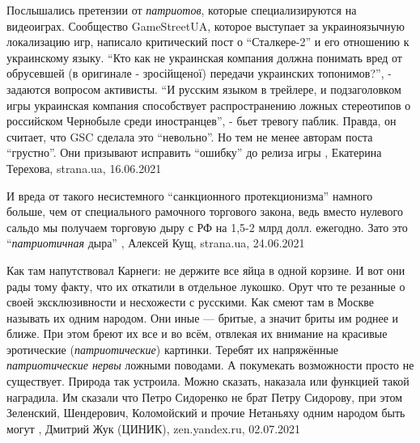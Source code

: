 Послышались претензии от \emph{патриотов}, которые специализируются на видеоиграх.
Сообщество GameStreetUA, которое выступает за украиноязычную локализацию игр,
написало критический пост о \enquote{Сталкере-2} и его отношению к украинскому
языку. \enquote{Кто как не украинская компания должна понимать вред от
обрусевшей (в оригинале - зросійщеної) передачи украинских топонимов?}, -
задаются вопросом активисты. \enquote{И русским языком в трейлере, и
подзаголовком игры украинская компания способствует распространению ложных
стереотипов о российском Чернобыле среди иностранцев}, - бьет тревогу паблик.
Правда, он считает, что GSC сделала это \enquote{невольно}. Но тем не менее
авторам поста \enquote{грустно}. Они призывают исправить \enquote{ошибку} до
релиза игры
, 
Екатерина Терехова, strana.ua, 16.06.2021

И вреда от такого несистемного \enquote{санкционного протекционизма} намного больше,
чем от специального рамочного торгового закона, ведь вместо нулевого сальдо мы
получаем торговую дыру с РФ на 1,5-2 млрд долл. ежегодно. Зато это
\enquote{\emph{патриотичная} дыра}
, 
Алексей Кущ, strana.ua, 24.06.2021

Как там напутствовал Карнеги: не держите все яйца в одной корзине. И вот они
рады тому факту, что их откатили в отдельное лукошко. Орут что те резанные о
своей эксклюзивности и несхожести с русскими. Как смеют там в Москве называть
их одним народом. Они иные — бритые, а значит бриты им роднее и ближе. При этом
бреют их все и во всём, отвлекая их внимание на красивые эротические
(\emph{патриотические}) картинки. Теребят их напряжённые \emph{патриотические нервы} ложными
поводами. А покумекать возможности просто не существует. Природа так устроила.
Можно сказать, наказала или функцией такой наградила. Им сказали что Петро
Сидоренко не брат Петру Сидорову, при этом Зеленский, Шендерович, Коломойский и
прочие Нетаньяху одним народом быть могут
, Дмитрий Жук (ЦИНИК), zen.yandex.ru, 02.07.2021

